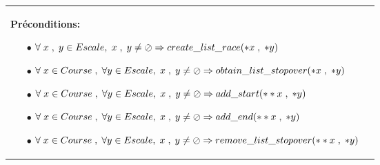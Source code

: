\documentclass[a4paper, 11pt, oneside]{article}
\begin{document}
\begin{tabular}{|p{17cm}|c}
				\textbf{Préconditions:}
					\begin{itemize}
						\item[$\bullet$] $\forall \hspace{1mm} x \hspace{1mm} , \hspace{1mm} y \in Escale, \hspace{1mm} x \hspace{1mm} , \hspace{1mm} y  \neq \oslash \Rightarrow create\_list\_race(*x \hspace{1mm} , \hspace{1mm}*y)$
						\item[$\bullet$] $\forall \hspace{1mm} x \in Course \hspace{1mm},\hspace{1mm} \forall y \in Escale, \hspace{1mm} x \hspace{1mm} , \hspace{1mm} y  \neq \oslash  \Rightarrow  obtain\_list\_stopover(*x \hspace{1mm} , \hspace{1mm }*y)$
						\item[$\bullet$] $\forall \hspace{1mm} x \in Course \hspace{1mm},\hspace{1mm} \forall y \in Escale, \hspace{1mm} x \hspace{1mm} , \hspace{1mm} y  \neq \oslash  \Rightarrow  add\_start(**x \hspace{1mm} , \hspace{1mm} *y)$
						\item[$\bullet$] $\forall \hspace{1mm} x \in Course \hspace{1mm},\hspace{1mm} \forall y \in Escale, \hspace{1mm} x \hspace{1mm} , \hspace{1mm} y  \neq \oslash  \Rightarrow  add\_end(**x \hspace{1mm} , \hspace{1mm} *y)$
						\item[$\bullet$] $\forall \hspace{1mm} x \in Course \hspace{1mm},\hspace{1mm} \forall y \in Escale, \hspace{1mm} x \hspace{1mm} , \hspace{1mm} y  \neq \oslash  \Rightarrow  remove\_list\_stopover(**x \hspace{1mm} ,\hspace{1mm} *y)$

\end{itemize}
\end{tabular}
\end{document}
